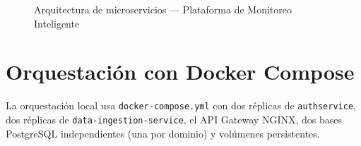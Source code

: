 \documentclass[12pt,a4paper]{article}
\begin{document}
\begin{figure}[H]
\caption{Arquitectura de microservicios --- Plataforma de Monitoreo Inteligente}
\end{figure}

\section{Orquestación con Docker Compose}

La orquestación local usa \texttt{docker-compose.yml} con dos réplicas de \texttt{authservice}, dos réplicas de \texttt{data-ingestion-service}, el API Gateway NGINX, dos bases PostgreSQL independientes (una por dominio) y volúmenes persistentes.
\end{document}
